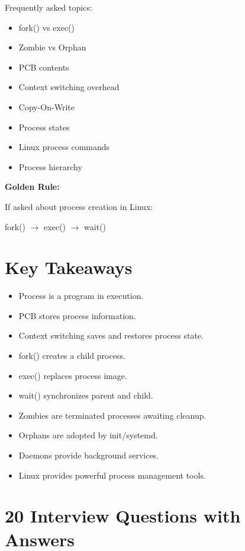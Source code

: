 Frequently asked topics:

\begin{itemize}
\item fork() vs exec()
\item Zombie vs Orphan
\item PCB contents
\item Context switching overhead
\item Copy-On-Write
\item Process states
\item Linux process commands
\item Process hierarchy
\end{itemize}

\textbf{Golden Rule:}

If asked about process creation in Linux:

\begin{center}
fork() $\rightarrow$ exec() $\rightarrow$ wait()
\end{center}

\section{Key Takeaways}

\begin{itemize}
\item Process is a program in execution.
\item PCB stores process information.
\item Context switching saves and restores process state.
\item fork() creates a child process.
\item exec() replaces process image.
\item wait() synchronizes parent and child.
\item Zombies are terminated processes awaiting cleanup.
\item Orphans are adopted by init/systemd.
\item Daemons provide background services.
\item Linux provides powerful process management tools.
\end{itemize}

\section{20 Interview Questions with Answers}

